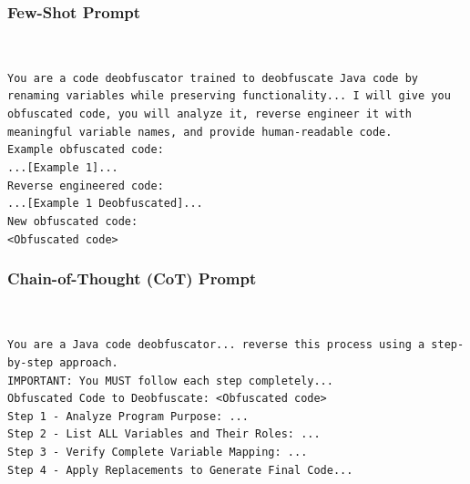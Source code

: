 \subsubsection{Few-Shot Prompt}~\\
\begin{tcolorbox}[colback=gray!5, colframe=gray!25, coltitle=black, boxrule=0.4pt, left=2pt, right=2pt, top=2pt, bottom=2pt, fontupper=\small]
\texttt{You are a code deobfuscator trained to deobfuscate Java code by renaming variables while preserving functionality... I will give you obfuscated code, you will analyze it, reverse engineer it with meaningful variable names, and provide human-readable code.}\\
\vspace{0.1cm}
\texttt{Example obfuscated code:}\\
\texttt{...[Example 1]...}\\
\vspace{0.1cm}
\texttt{Reverse engineered code:}\\
\texttt{...[Example 1 Deobfuscated]...}\\
\vspace{0.1cm}
\texttt{New obfuscated code:}\\
\texttt{<Obfuscated code>}
\end{tcolorbox}

\subsubsection{Chain-of-Thought (CoT) Prompt}~\\
\begin{tcolorbox}[colback=gray!5, colframe=gray!25, coltitle=black, boxrule=0.4pt, left=2pt, right=2pt, top=2pt, bottom=2pt, fontupper=\small]
\texttt{You are a Java code deobfuscator... reverse this process using a step-by-step approach.}\\
\texttt{IMPORTANT: You MUST follow each step completely...}\\
\texttt{Obfuscated Code to Deobfuscate: <Obfuscated code>}\\
\vspace{0.1cm}
\texttt{Step 1 - Analyze Program Purpose: ...}\\
\texttt{Step 2 - List ALL Variables and Their Roles: ...}\\
\texttt{Step 3 - Verify Complete Variable Mapping: ...}\\
\texttt{Step 4 - Apply Replacements to Generate Final Code...}
\end{tcolorbox}

